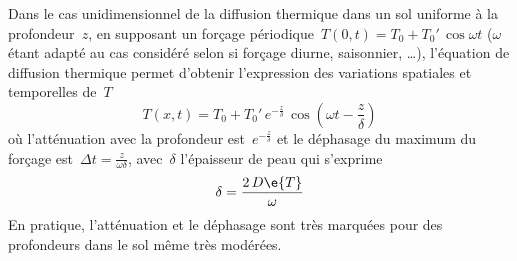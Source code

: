 \sk
Dans le cas unidimensionnel de la diffusion thermique dans un sol uniforme à la profondeur~$z$, en supposant un forçage périodique~$T(0,t) = T_0 + T_0' \, \cos \omega t$ ($\omega$ étant adapté au cas considéré selon si forçage diurne, saisonnier, \ldots), l'équation de diffusion thermique permet d'obtenir l'expression des variations spatiales et temporelles de~$T$
\[ T(x,t) = T_0 + T_0' \, e^{-\frac{z}{\delta}} \, \cos (\omega t - \frac{z}{\delta}) \]
\noindent où l'atténuation avec la profondeur est~$e^{-\frac{z}{\delta}}$ et le déphasage du maximum du forçage est~$\Delta t = \frac{z}{\omega \delta}$, avec~$\delta$ l'épaisseur de peau qui s'exprime
\[ \delta = \frac{2\,D\e{T}}{\omega} \]
\noindent En pratique, l'atténuation et le déphasage sont très marquées pour des profondeurs dans le sol même très modérées.






